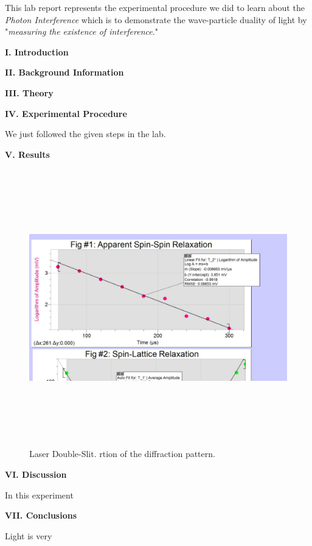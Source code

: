 \documentclass[fleqn]{article}
\begin{document}
  \vspace{10px}

  This lab report represents the experimental procedure we did to learn about the \emph{Photon Interference} which is to demonstrate 
  the wave-particle duality of light by "\emph{measuring the existence of interference}." \textcite{One}

  \vspace{20px}


  \textbf{I. Introduction}

  \vspace{10px}


  \textbf{II. Background Information}

  \vspace{10px}


  \textbf{III. Theory}

  \vspace{10px}


  \textbf{IV. Experimental Procedure}

  \vspace{10px}

  We just followed the given steps in the lab. 
  

  \textbf{V. Results}

  \vspace{10px}

    
  \begin{figure}[h!]
    \includegraphics[height=12cm, width=18cm]{Fig1.JPG}
    \caption{
      Laser Double-Slit. rtion of the diffraction
      pattern.
    }
  \end{figure}

  \pagebreak

  \textbf{VI. Discussion}

  \vspace{10px}

  In this experiment 
  
  \vspace{20px}


  \textbf{VII. Conclusions}

  \vspace{10px}

  Light is very 
  
  \vspace{20px}


  \printbibliography
\end{document}
